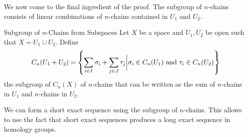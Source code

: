 \documentclass[a4paper]{article}
\begin{document}
We now come to the final ingredient of the proof. The subgroup of $n$-chains consists of linear combinations of $n$-chains contained in $U_1$ and $U_2$. 

\begin{defn}{Subgroup of $n$-Chains from Subspaces}{} Let $X$ be a space and $U_1,U_2$ be open such that $X=U_1\cup U_2$. Define $$C_n(U_1+U_2)=\left\{\sum_{i\in I}\sigma_i+\sum_{j\in J}\tau_j\bigg{|}\sigma_i\in C_n(U_1)\text{ and }\tau_i\in C_n(U_2)\right\}$$ the subgroup of $C_n(X)$ of $n$-chains that can be written as the sum of $n$-chains in $U_1$ and $n$-chains in $U_2$. 
\end{defn}

We can form a short exact sequence using the subgroup of $n$-chains. This allows to use the fact that short exact sequences produces a long exact sequence in homology groups. 
\end{document}
